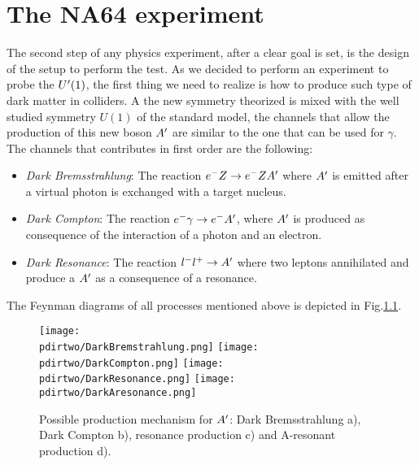 
\newcommand{\pdirtwo}{chapters/plots/chapter2}

\chapter{The NA64 experiment} %

\label{chapter2} %


The second step of any physics experiment, after a clear goal is set, is the design of the setup to perform the test. As we decided to perform an experiment to probe the $U'(1)$, the first thing we need to realize is how to produce such type of dark matter in colliders. A the new symmetry theorized is mixed with the well studied symmetry $U(1)$ of the standard model, the channels that allow the production of this new boson $A'$ are similar to the one that can be used for $\gamma$. The channels that contributes in first order are the following:

\begin{itemize}
\item \textit{Dark Bremsstrahlung}: The reaction $e^- Z \to e^- Z A'$ where $A'$ is emitted after a virtual photon is exchanged with a target nucleus.
\item \textit{Dark Compton}: The reaction $e^- \gamma \to e^- A'$, where $A'$ is produced as consequence of the interaction of a photon and an electron.
\item \textit{Dark Resonance}: The reaction $l^- l^+ \to A'$ where two leptons annihilated and produce a $A'$ as a consequence of a resonance.
\end{itemize}

The Feynman diagrams of all processes mentioned above is depicted in Fig.\ref{fig:dm-production-mechanism}.

\begin{figure}
  \centering
  \texttt{[image: \\pdirtwo/DarkBremstrahlung.png]}
  \texttt{[image: \\pdirtwo/DarkCompton.png]}
  \texttt{[image: \\pdirtwo/DarkResonance.png]}
  \texttt{[image: \\pdirtwo/DarkAresonance.png]}
  \caption{Possible production mechanism for $A'$: Dark Bremsstrahlung a), Dark Compton b), resonance production c) and A-resonant production d).}
  \label{fig:dm-production-mechanism}
\end{figure}

